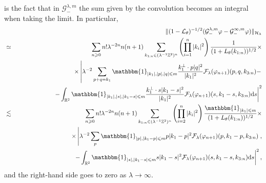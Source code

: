 \documentclass[10pt]{article}
\newcommand{\mathd}{\mathrm{d}}
\begin{document}
is the fact that in $\mathcal{G}^{\lambda, m}_-$ the sum given by the
convolution becomes an integral when taking the limit. In particular,
\begin{eqnarray*}
  &  & \| (1 -\mathcal{L}_{\theta})^{- 1 / 2} (\mathcal{G}_-^{\lambda, m}
  \varphi -\mathcal{G}_-^{\infty, m} \varphi) \|_{\mathcal{H}_{\lambda}}\\
  & \simeq & \sum_{n \geqslant 0} n! \lambda^{- 2 n} n (n + 1) \sum_{k_{1 :
  n} \in (\lambda^{- 1} \mathbb{Z}^2)^n} \left( \prod_{i = 1}^n | k_i |^2
  \right) \frac{1}{(1 + L_{\theta} (k_{1 : n}))^{1 / 2}} \times\\
  &  & \times \left| \lambda^{- 2} \sum_{p + q = k_1} \mathbbm{1}_{| k_1 |, |
  p |, | q | \leqslant m}  \frac{k_1^{\bot} \cdot p | q |^2}{| k_1 |^2}
  \mathcal{F}_{\lambda} (\varphi_{n + 1}) (p, q, k_{3 : n}) - \right. \\
  &  & \qquad \qquad \qquad \left. - \int_{\mathbb{R}^2} \mathbbm{1}_{| k_1
  |, | s |, | k_1 - s | \leqslant m}  \frac{k_1^{\bot} \cdot s | k_1 - s
  |^2}{| k_1 |^2} \mathcal{F}_{\lambda} (\varphi_{n + 1}) (s, k_1 - s, k_{3 :
  n}) \mathd s \right|^2 \\
  & \lesssim & \sum_{n \geqslant 0} n! \lambda^{- 2 n} n (n + 1) \sum_{k_{1 :
  n} \in (\lambda^{- 1} \mathbb{Z}^2)^n} \left( \prod_{i = 2}^n | k_i |^2
  \right)  \frac{\mathbbm{1}_{| k_1 | \leqslant m}}{(1 + L_{\theta} (k_{1 :
  n}))^{1 / 2}} \times\\
  &  & \times \left| \lambda^{- 2} \sum_p \mathbbm{1}_{| p |, | k_1 - p |
  \leqslant m} p | k_1 - p |^2 \mathcal{F}_{\lambda} (\varphi_{n + 1}) (p, k_1
  - p, k_{3 : n}) \right.,\\
  &  & \qquad \qquad \qquad \qquad \left. - \int_{\mathbb{R}^2}
  \mathbbm{1}_{| s |, | k_1 - s | \leqslant m} s | k_1 - s |^2
  \mathcal{F}_{\lambda} (\varphi_{n + 1}) (s, k_1 - s, k_{3 : n}) \mathd s
  \right|^2,
\end{eqnarray*}
and the right-hand side goes to zero as $\lambda \rightarrow \infty$.
\end{document}
